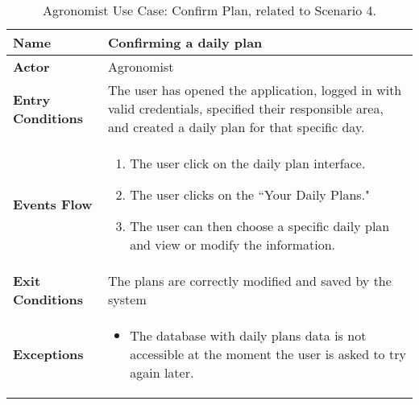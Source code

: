 
\begin{table}[hbt!]
\centering
\small
\caption{\label{tab:agrConfirmPlan}Agronomist Use Case: Confirm Plan, related to Scenario 4.}
\renewcommand{\arraystretch}{1.25}

\begin{tabular}{|l|>{\raggedright\arraybackslash}m{12cm}|}

    \hline
    \textbf{Name} & Confirming a daily plan\\
    \hline
   	\textbf{Actor} & Agronomist\\
    \hline
    \textbf{Entry Conditions} & The user has opened the application, logged in with valid credentials, specified their responsible area, and created a daily plan for that specific day.\\
    \hline
    \textbf{Events Flow} & \begin{enumerate}
            \item The user click on the daily plan interface.
            \item The user clicks on the “Your Daily Plans."
            \item The user can then choose a specific daily plan and view or modify the information.
       \end{enumerate}\\
    \hline
    \textbf{Exit Conditions} & The plans are correctly modified and saved by the system\\
    \hline
    \textbf{Exceptions} & 
       \begin{itemize}
          \item The database with daily plans data is not accessible at the moment the user is asked to try again later.
        \end{itemize}
     \\
    \hline
\end{tabular}
\end{table}